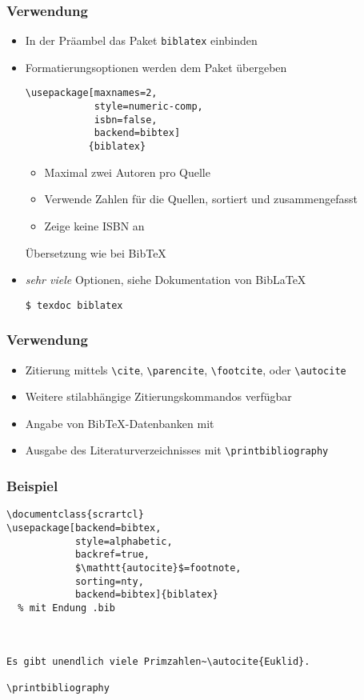 \begin{frame}[fragile]
  \frametitle{Verwendung}
  \onslide<+->

  \begin{itemize}
  \item<+-> In der Präambel das Paket \lstinline|biblatex| einbinden
  \item<+-> Formatierungsoptionen werden dem Paket übergeben \onslide<+->
\begin{lstlisting}
\usepackage[maxnames=2,
            style=numeric-comp,
            isbn=false,
            backend=bibtex]
           {biblatex}
\end{lstlisting}
    \begin{itemize}
    \item<+-> Maximal zwei Autoren pro Quelle
    \item<+-> Verwende Zahlen für die Quellen, sortiert und zusammengefasst
    \item<+-> Zeige keine ISBN an
    \end{itemize}
    \onslide<+->%
    Übersetzung wie bei Bib\TeX
  \item<+-> \emph{sehr viele} Optionen, siehe Dokumentation von Bib\LaTeX
\begin{verbatim}
$ texdoc biblatex
\end{verbatim}
  \end{itemize}
\end{frame}

\begin{frame}[fragile]
  \frametitle{Verwendung}
  \begin{itemize}
  \item<+-> Zitierung mittels \lstinline|\cite|, \lstinline|\parencite|,
    \lstinline|\footcite|, oder \lstinline|\autocite|
  \item<+-> Weitere stilabhängige Zitierungskommandos verfügbar
  \item<+-> Angabe von Bib\TeX-Datenbanken mit
    \lstinline||
  \item<+-> Ausgabe des Literaturverzeichnisses mit
    \lstinline|\printbibliography|
  \end{itemize}
\end{frame}

\begin{frame}[fragile]
  \frametitle{Beispiel}
  \onslide<+->

\begin{lstlisting}[frame=none]
\documentclass{scrartcl}
\usepackage[backend=bibtex,
            style=alphabetic,
            backref=true,
            $\mathtt{autocite}$=footnote,
            sorting=nty,
            backend=bibtex]{biblatex}
  % mit Endung .bib



Es gibt unendlich viele Primzahlen~\autocite{Euklid}.

\printbibliography


\end{lstlisting}

\end{frame}

